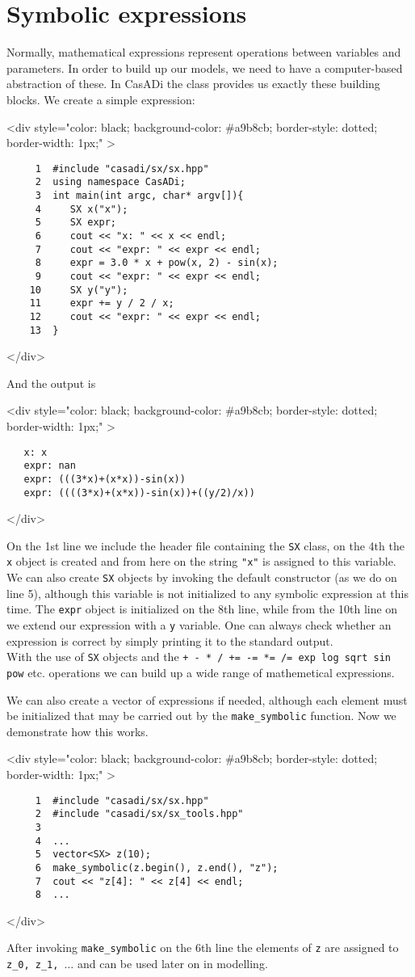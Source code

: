 \documentclass[a4paper,12pt]{book}
\newcommand{\codebegin}{
\begin{rawhtml}
<div style="color: black; background-color: \#a9b8cb;  border-style: dotted; border-width: 1px;" >
\end{rawhtml}
}
\newcommand{\codeend}{
\begin{rawhtml}
</div>
\end{rawhtml}
}
\newcommand{\codebegin}{

}
\newcommand{\codeend}{

}
\begin{document}
{\section{Symbolic expressions}
Normally, mathematical expressions represent operations between variables and parameters.
In order to build up our models, we need to have a computer-based abstraction of these. In CasADi
the \texttt{} class provides us exactly these building blocks. We create a simple expression:
\par
\codebegin
\begin{verbatim}
     1  #include "casadi/sx/sx.hpp"
     2  using namespace CasADi;
     3  int main(int argc, char* argv[]){
     4     SX x("x");
     5     SX expr;
     6     cout << "x: " << x << endl;
     7     cout << "expr: " << expr << endl;
     8     expr = 3.0 * x + pow(x, 2) - sin(x);
     9     cout << "expr: " << expr << endl;
    10     SX y("y");
    11     expr += y / 2 / x;
    12     cout << "expr: " << expr << endl;
    13  }
\end{verbatim}
\codeend
And the output is
\par
\codebegin
\begin{verbatim}
   x: x
   expr: nan
   expr: (((3*x)+(x*x))-sin(x))
   expr: ((((3*x)+(x*x))-sin(x))+((y/2)/x))
\end{verbatim}
\codeend
On the 1st line we include the header file containing the \texttt{SX} class, on the 4th the \texttt{x} object
is created and from here on the string \texttt{"x"} is assigned to this variable. We can also create 
\texttt{SX} objects by invoking the default constructor (as we do on line 5), although this variable is not initialized to any symbolic
expression at this time. The \texttt{expr} object is initialized on the 8th line, while from the 10th line on we extend our expression
with a \texttt{y} variable. One can always check whether an expression is correct by simply printing it to the standard output.\\
With the use of \texttt{SX} objects and the \texttt{+ - * / += -= *= /= exp log sqrt sin pow} etc. operations we can build up a
wide range of mathemetical expressions.
\par
We can also create a vector of expressions if needed, although each element must be initialized that may be
carried out by the \texttt{make\_symbolic} function. Now we demonstrate how this works.
\par
\codebegin
\begin{verbatim}
     1  #include "casadi/sx/sx.hpp"
     2  #include "casadi/sx/sx_tools.hpp"
     3  
     4  ...
     5  vector<SX> z(10);
     6  make_symbolic(z.begin(), z.end(), "z");
     7  cout << "z[4]: " << z[4] << endl;
     8  ...
\end{verbatim}
\codeend
After invoking \texttt{make\_symbolic} on the 6th line the elements of \texttt{z} are assigned to \texttt{z\_0, z\_1, $\dots$} and can be used later on in modelling.
}
\end{document}
